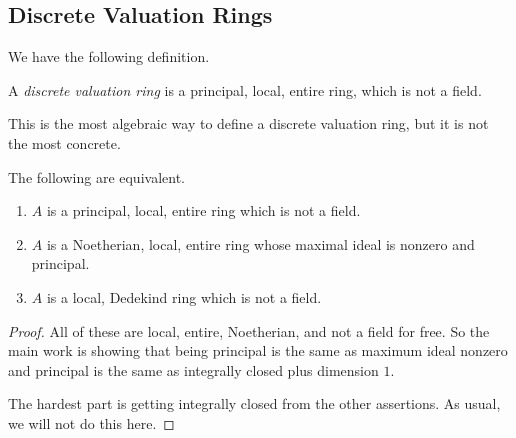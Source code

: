 \subsection{Discrete Valuation Rings}
We have the following definition.
\begin{definition}
    A \textit{discrete valuation ring} is a principal, local, entire ring, which is not a field.
\end{definition}
This is the most algebraic way to define a discrete valuation ring, but it is not the most concrete.
\begin{proposition}
    The following are equivalent.
    \begin{enumerate}[label=(\alph*)]
        \item $A$ is a principal, local, entire ring which is not a field.
        \item $A$ is a Noetherian, local, entire ring whose maximal ideal is nonzero and principal.
        \item $A$ is a local, Dedekind ring which is not a field.
    \end{enumerate}
\end{proposition}
\begin{proof}
    All of these are local, entire, Noetherian, and not a field for free. So the main work is showing that being principal is the same as maximum ideal nonzero and principal is the same as integrally closed plus dimension $1.$

    The hardest part is getting integrally closed from the other assertions. As usual, we will not do this here.
\end{proof}

